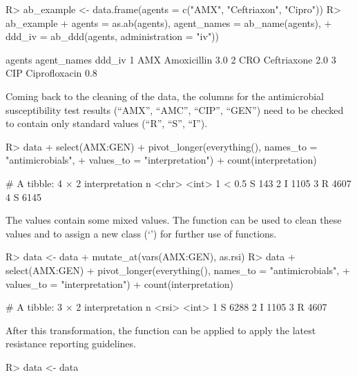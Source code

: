 \documentclass[article, shortnames]{jss}
\newcommand{\class}[1]{`\code{#1}'}
\newcommand{\fct}[1]{\code{#1()}}
\begin{document}
%
\begin{CodeChunk}
\begin{CodeInput}
R> ab_example <- data.frame(agents = c("AMX", "Ceftriaxon", "Cipro"))
R> ab_example %
+    agents = as.ab(agents), agent_names = ab_name(agents),
+    ddd_iv = ab_ddd(agents, administration = "iv"))
\end{CodeInput}
\begin{CodeOutput}
  agents   agent_names ddd_iv
1    AMX   Amoxicillin    3.0
2    CRO   Ceftriaxone    2.0
3    CIP Ciprofloxacin    0.8
\end{CodeOutput}
\end{CodeChunk}
%
Coming back to the cleaning of the data, the columns for the antimicrobial
susceptibility test results (``AMX'', ``AMC'', ``CIP'', ``GEN'') need to be
checked to contain only standard values (``R'', ``S'', ``I'').
%
\begin{CodeChunk}
\begin{CodeInput}
R> data %
+    select(AMX:GEN) %
+    pivot_longer(everything(), names_to = "antimicrobials",
+    values_to = "interpretation") %
+    count(interpretation)
\end{CodeInput}
\begin{CodeOutput}
# A tibble: 4 × 2
  interpretation     n
  <chr>          <int>
1 < 0.5 S          143
2 I               1105
3 R               4607
4 S               6145
\end{CodeOutput}
\end{CodeChunk}
%
The values contain some mixed values.  The \fct{as.rsi} function can be used
to clean these values and to assign a new class (\class{rsi}) for further
use of  functions.
%
\begin{CodeChunk}
\begin{CodeInput}
R> data <- data %
+    mutate_at(vars(AMX:GEN), as.rsi)
R> data %
+    select(AMX:GEN) %
+    pivot_longer(everything(), names_to = "antimicrobials",
+    values_to = "interpretation") %
+    count(interpretation)
\end{CodeInput}
\begin{CodeOutput}
# A tibble: 3 × 2
  interpretation     n
  <rsi>          <int>
1 S               6288
2 I               1105
3 R               4607
\end{CodeOutput}
\end{CodeChunk}
%
After this transformation, the \fct{eucast\_rules} function can be applied
to apply the latest resistance reporting guidelines.
%
\begin{CodeChunk}
\begin{CodeInput}
R> data <- data %
\end{CodeInput}
\end{CodeChunk}
\end{document}
